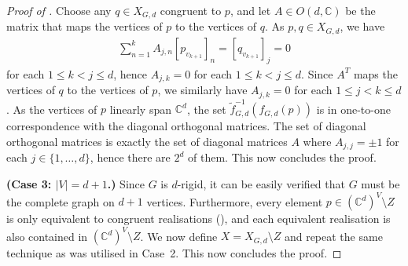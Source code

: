 \begin{proof}[Proof of ]
	Choose any $q \in X_{G,d}$ congruent to $p$,
	and let $A \in O(d,\mathbb{C})$ be the matrix that maps the vertices of $p$ to the vertices of $q$.
	As $p,q \in X_{G,d}$, we have 
	\begin{align*}
		\sum_{n=1}^k A_{j,n} [p_{v_{k+1}}]_n = [q_{v_{k+1}}]_j = 0
	\end{align*}
	for each $1 \leq k < j \leq d$,
	hence $A_{j,k}=0$ for each $1 \leq k < j \leq d$.
	Since $A^T$ maps the vertices of $q$ to the vertices of $p$,
	we similarly have $A_{j,k}=0$ for each $1 \leq j < k \leq d$.
	As the vertices of $p$ linearly span $\mathbb{C}^d$,
	the set $\tilde{f}_{G,d}^{-1}\left(f_{G,d}(p) \right)$ is in one-to-one correspondence with the diagonal orthogonal matrices.
	The set of diagonal orthogonal matrices is exactly the set of diagonal matrices $A$ where $A_{j,j} = \pm 1$ for each $j \in \{1,\ldots, d\}$,
	hence there are $2^d$ of them.
	This now concludes the proof.
	
	\textbf{(Case 3: $|V| =d+1$.)}	
	Since $G$ is $d$-rigid, it can be easily verified that $G$ must be the complete graph on $d+1$ vertices.
	Furthermore,
	every element $p \in (\mathbb{C}^d)^V \setminus Z$ is only equivalent to congruent realisations (\cite[Corollary 8]{Gortler2014}),
	and each equivalent realisation is also contained in $(\mathbb{C}^d)^V \setminus Z$.
	We now define $X = X_{G,d} \setminus Z$ and repeat the same technique as was utilised in Case~2.
	This now concludes the proof.
\end{proof}





